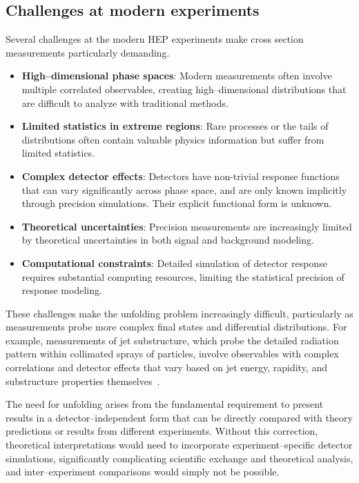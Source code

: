 \begin{definition}
\section{Challenges at modern experiments}
Several challenges at the modern HEP experiments make cross section measurements particularly demanding.

    \begin{itemize}
        \item \textbf{High--dimensional phase spaces}: Modern measurements often involve multiple correlated observables, creating high--dimensional distributions that are difficult to analyze with traditional methods.
        \item \textbf{Limited statistics in extreme regions}: Rare processes or the tails of distributions often contain valuable physics information but suffer from limited statistics.
        \item \textbf{Complex detector effects}: Detectors have non-trivial response functions that can vary significantly across phase space, and are only known implicitly through precision simulations. Their explicit functional form is unknown.
        \item \textbf{Theoretical uncertainties}: Precision measurements are increasingly limited by theoretical uncertainties in both signal and background modeling.
        \item \textbf{Computational constraints}: Detailed simulation of detector response requires substantial computing resources, limiting the statistical precision of response modeling.
    \end{itemize}
    These challenges make the unfolding problem increasingly difficult, particularly as measurements probe more complex final states and differential distributions.
    For example, measurements of jet substructure, which probe the detailed radiation pattern within collimated sprays of particles, involve observables with complex correlations and detector effects that vary based on jet energy, rapidity, and substructure properties themselves~\cite{Larkoski2020JetLearning, kogler_jet_2019, mozer_jet_2017}.
    
    The need for unfolding arises from the fundamental requirement to present results in a detector--independent form that can be directly compared with theory predictions or results from different experiments.
    Without this correction, theoretical interpretations would need to incorporate experiment--specific detector simulations, significantly complicating scientific exchange and theoretical analysis, and inter--experiment comparisons would simply not be possible.


\end{definition}
